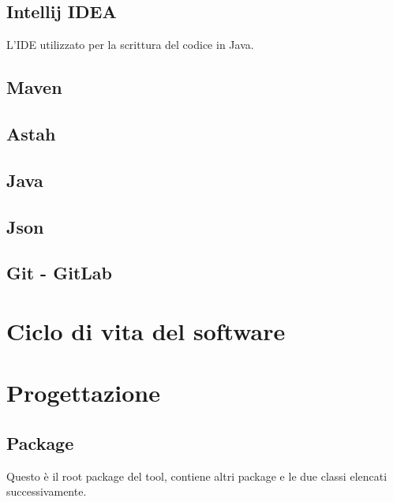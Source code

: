 \subsection*{Intellij IDEA}
L'IDE utilizzato per la scrittura del codice in Java.

\subsection*{Maven}
\subsection*{Astah}

\subsection*{Java}
\subsection*{Json}
\subsection*{Git - GitLab}


\section{Ciclo di vita del software}
\label{sec:ciclo-vita-software}

\section{Progettazione}
\label{sec:progettazione}

\subsection{Package}\label{subsec:package}
Questo è il root package del tool, contiene altri package e le due classi elencati successivamente.
\begin{namespacedesc}
\end{namespacedesc}


